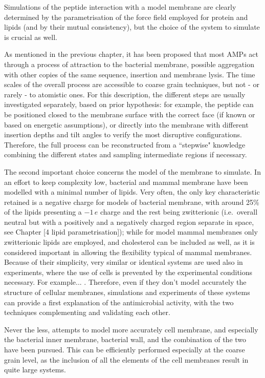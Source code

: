 Simulations of the peptide interaction with a model membrane are clearly determined by the parametrisation of the force field employed for protein and lipids (and by their mutual consistency), but the choice of the system to simulate is crucial as well.

As mentioned in the previous chapter, it has been proposed that most AMPs act through a process of attraction to the bacterial membrane, possible aggregation with other copies of the same sequence, insertion and membrane lysis. The time scales of the overall process are accessible to coarse grain techniques, but not - or rarely - to atomistic ones. For this description, the different steps are usually investigated separately, based on prior hypothesis: for example, the peptide can be positioned closed to the membrane surface with the correct face (if known or based on energetic assumptions), or directly into the membrane with different insertion depths and tilt angles to verify the most disruptive configurations. Therefore, the full process can be reconstructed from a ``stepwise" knowledge combining the different states and sampling intermediate regions if necessary.

The second important choice concerns the model of the membrane to simulate. In an effort to keep complexity low, bacterial and mammal membrane have been modelled with a minimal number of lipids. Very often, the only key characteristic retained is a negative charge for models of bacterial membrane, with around 25\% of the lipids presenting a $-1\,e$ charge and the rest being zwitterionic (i.e.\ overall neutral but with a positively and a negatively charged region separate in space, see Chapter [4 lipid parametrisation]); while for model mammal membranes only zwitterionic lipids are employed, and cholesterol can be included as well, as it is considered important in allowing the flexibility typical of mammal membranes.
%
Because of their simplicity, very similar or identical systems are used also in experiments, where the use of cells is prevented by the experimental conditions necessary. For example... . Therefore, even if they don't model accurately the structure of cellular membranes, simulations and experiments of these systems can provide a first explanation of the antimicrobial activity, with the two techniques complementing and validating each other.

Never the less, attempts to model more accurately cell membrane, and especially the bacterial inner membrane, bacterial wall, and the combination of the two have been pursued. This can be efficiently performed especially at the coarse grain level, as the inclusion of all the elements of the cell membranes result in quite large systems.


















